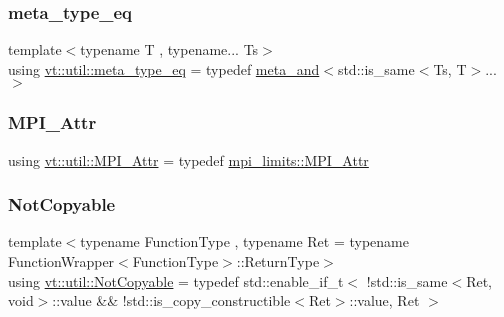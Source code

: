 \mbox{\label{namespacevt_1_1util_aaa76da2983f12be56a31a96c017e8dd1}} 
\subsubsection{\texorpdfstring{meta\+\_\+type\+\_\+eq}{meta\_type\_eq}}
{\footnotesize\ttfamily template$<$typename T , typename... Ts$>$ \\
using \hyperlink{namespacevt_1_1util_aaa76da2983f12be56a31a96c017e8dd1}{vt\+::util\+::meta\+\_\+type\+\_\+eq} = typedef \hyperlink{structvt_1_1util_1_1meta__and}{meta\+\_\+and}$<$std\+::is\+\_\+same$<$Ts, T$>$...$>$}

\mbox{\label{namespacevt_1_1util_acdef825f3bbbffb020925d3ba6151df9}} 
\subsubsection{\texorpdfstring{M\+P\+I\+\_\+\+Attr}{MPI\_Attr}}
{\footnotesize\ttfamily using \hyperlink{namespacevt_1_1util_acdef825f3bbbffb020925d3ba6151df9}{vt\+::util\+::\+M\+P\+I\+\_\+\+Attr} = typedef \hyperlink{structvt_1_1util_1_1mpi__limits_1_1_m_p_i___attr}{mpi\+\_\+limits\+::\+M\+P\+I\+\_\+\+Attr}}

\mbox{\label{namespacevt_1_1util_a0760a3963341a602dfe2dfc42d78c867}} 
\subsubsection{\texorpdfstring{Not\+Copyable}{NotCopyable}}
{\footnotesize\ttfamily template$<$typename Function\+Type , typename Ret  = typename Function\+Wrapper$<$\+Function\+Type$>$\+::\+Return\+Type$>$ \\
using \hyperlink{namespacevt_1_1util_a0760a3963341a602dfe2dfc42d78c867}{vt\+::util\+::\+Not\+Copyable} = typedef std\+::enable\+\_\+if\+\_\+t$<$ !std\+::is\+\_\+same$<$Ret, void$>$\+::value \&\& !std\+::is\+\_\+copy\+\_\+constructible$<$Ret$>$\+::value, Ret $>$}


